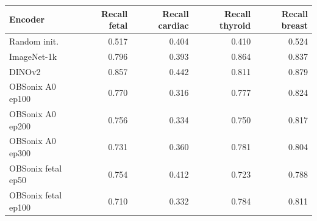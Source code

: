 \begin{tabular}{lrrrr}
\toprule
Encoder & Recall fetal & Recall cardiac & Recall thyroid & Recall breast \\
\midrule
Random init. & 0.517 & 0.404 & 0.410 & 0.524 \\
ImageNet-1k & 0.796 & 0.393 & 0.864 & 0.837 \\
DINOv2 & 0.857 & 0.442 & 0.811 & 0.879 \\
OBSonix A0 ep100 & 0.770 & 0.316 & 0.777 & 0.824 \\
OBSonix A0 ep200 & 0.756 & 0.334 & 0.750 & 0.817 \\
OBSonix A0 ep300 & 0.731 & 0.360 & 0.781 & 0.804 \\
OBSonix fetal ep50 & 0.754 & 0.412 & 0.723 & 0.788 \\
OBSonix fetal ep100 & 0.710 & 0.332 & 0.784 & 0.811 \\
\bottomrule
\end{tabular}
